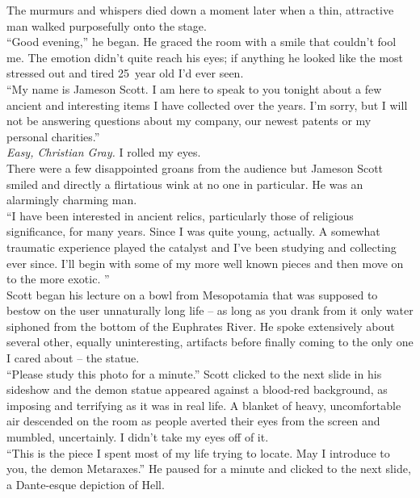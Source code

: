 \documentclass[a5paper]{scrartcl}
\begin{document}
The murmurs and whispers died down a moment later when a thin, attractive man walked purposefully onto the stage.\\


\enquote{Good evening,} he began. He graced the room with a smile that couldn't fool me. The emotion didn't quite reach his eyes; if anything he looked like the most stressed out and tired 25~year old I'd ever seen.\\


\enquote{My name is Jameson Scott. I am here to speak to you tonight about a few ancient and interesting items I have collected over the years. I'm sorry, but I will not be answering questions about my company, our newest patents or my personal charities.}\\


\textit{Easy, Christian Gray.}
 I rolled my eyes.\\


There were a few disappointed groans from the audience but Jameson Scott smiled and directly a flirtatious wink at no one in particular. He was an alarmingly charming man.\\


\enquote{I have been interested in ancient relics, particularly those of religious significance, for many years. Since I was quite young, actually. A somewhat traumatic experience played the catalyst and I've been studying and collecting ever since. I'll begin with some of my more well known pieces and then move on to the more exotic. }\\


Scott began his lecture on a bowl from Mesopotamia that was supposed to bestow on the user unnaturally long life -- as long as you drank from it only water siphoned from the bottom of the Euphrates River. He spoke extensively about several other, equally uninteresting, artifacts before finally coming to the only one I cared about -- the statue.\\


\enquote{Please study this photo for a minute.} Scott clicked to the next slide in his sideshow and the demon statue appeared against a blood-red background, as imposing and terrifying as it was in real life. A blanket of heavy, uncomfortable air descended on the room as people averted their eyes from the screen and mumbled, uncertainly. I didn't take my eyes off of it.\\


\enquote{This is the piece I spent most of my life trying to locate. May I introduce to you, the demon Metaraxes.} He paused for a minute and clicked to the next slide, a Dante-esque depiction of Hell. \\
\end{document}
